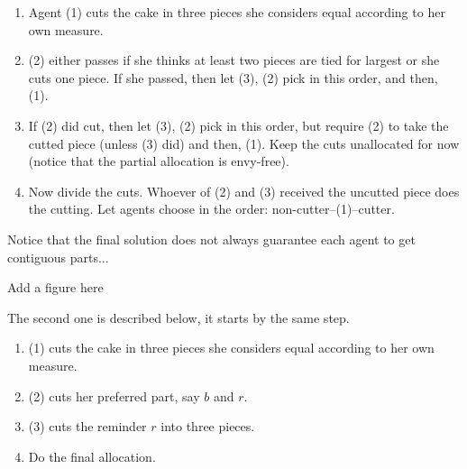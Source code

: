 \begin{enumerate}
\item 
Agent (1) cuts the cake in three pieces she considers equal according to her own measure.
\item
(2) either passes if she thinks at least two pieces are tied for largest or she cuts one piece.
If she passed, then let (3), (2) pick in this order, and then, (1).
\item
If (2) did cut, then let (3), (2) pick in this order, but require (2) to take the cutted piece (unless (3) did) and then, (1). 
Keep the cuts unallocated for now (notice that the partial allocation is envy-free).
\item
Now divide the cuts. 
Whoever of (2) and (3) received the uncutted piece does the cutting. 
Let agents choose in the order: non-cutter--(1)--cutter.
\end{enumerate}

Notice that the final solution does not always guarantee each agent to get contiguous parts...

{\Denis Add a figure here}

The second one is described below, it starts by the same step. 
\begin{enumerate}
\item 
(1) cuts the cake in three pieces she considers equal according to her own measure.
\item
(2) cuts her preferred part, say $b$ and $r$.
\item
(3) cuts the reminder $r$ into three pieces.
\item
Do the final allocation.
\end{enumerate}

